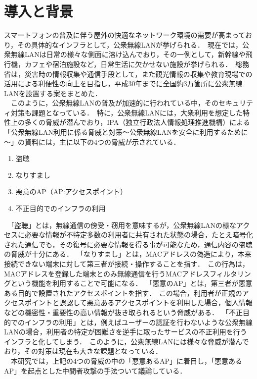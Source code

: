 \documentclass[dvipdfmx,twocolumn]{jsarticle}
\begin{document}
    \section{導入と背景}
        スマートフォンの普及に伴う屋外の快適なネットワーク環境の需要が高まっており，その具体的なインフラとして，公衆無線LANが挙げられる．\
        現在では，公衆無線LANは日常の様々な側面に溶け込んでおり，その一例として，新幹線や飛行機，カフェや宿泊施設など，日常生活に欠かせない施設が挙げられる．\
        総務省は，災害時の情報収集や通信手段として，また観光情報の収集や教育現場での活用による利便性の向上を目指し，平成30年までに全国約3万箇所に公衆無線LANを設置する案をまとめた\cite{SoumuWiFi}．\\
        　このように，公衆無線LANの普及が加速的に行われている中，そのセキュリティ対策も課題となっている．\
        特に，公衆無線LANには，大衆利用を想定した特性上の多くの脅威が潜んでおり，IPA（独立行政法人情報処理推進機構）による「公衆無線LAN利用に係る脅威と対策～公衆無線LANを安全に利用するために～」の資料\cite{IPA}には，主に以下の4つの脅威が示されている．\
        \begin{enumerate}
            \item 盗聴
            \item なりすまし
            \item 悪意のAP（AP:アクセスポイント）
            \item 不正目的でのインフラの利用
        \end{enumerate}
        　「盗聴」とは，無線通信の傍受・窃用を意味するが，公衆無線LANの様なアクセスに必要な情報が不特定多数の利用者に共有された状態の場合，たとえ暗号化された通信でも，その復号に必要な情報を得る事が可能なため，通信内容の盗聴の脅威が十分にある．\
        「なりすまし」とは，MACアドレスの偽造により，本来接続できない端末に対して第三者が接続・操作することを指す．\
        この行為は，MACアドレスを登録した端末とのみ無線通信を行うMACアドレスフィルタリングという機能を利用することで可能になる．\
        「悪意のAP」とは，第三者が悪意ある目的で設置されたアクセスポイントを指す．\
        この場合，利用者が正規のアクセスポイントと誤認して悪意あるアクセスポイントを利用した場合，個人情報などの機密性・重要性の高い情報が抜き取られるという脅威がある．\
        「不正目的でのインフラの利用」とは，例えばユーザーの認証を行わないような公衆無線LANの場合，利用者の特定が困難さを逆手に取ったサービスの不正利用を行うインフラと化してしまう．\
        このように，公衆無線LANには様々な脅威が潜んでおり，その対策は現在も大きな課題となっている．\\
        　本研究では，上記の4つの脅威の中の「悪意あるAP」に着目し，「悪意あるAP」を起点とした中間者攻撃の手法ついて議論している．\
\end{document}
